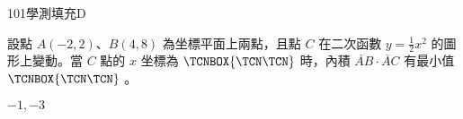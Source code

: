     \begin{QUESTION}
        \begin{ExamInfo}{101}{學測}{填充}{D}
        \end{ExamInfo}
        \begin{ExamAnsRateInfo}{37}{83}{27}{1}
        \end{ExamAnsRateInfo}
        \begin{QBODY}
            設點 $A(-2,2)$、$B(4,8)$ 為坐標平面上兩點，且點 $C$ 在二次函數 $y = \frac{1}{2}x^2$ 的圖形上變動。當 $C$ 點的 $x$ 坐標為 $\TCNBOX{\TCN\TCN}$ 時，內積 $\lvec{AB}\cdot \lvec{AC}$ 有最小值 $\TCNBOX{\TCN\TCN}$ 。
        \end{QBODY}
        \begin{QFROMS}
        \end{QFROMS}
        \begin{QTAGS}\end{QTAGS}
        \begin{QANS}
            $-1,-3$
        \end{QANS}
        \begin{QSOLLIST}
        \end{QSOLLIST}
        \begin{QEMPTYSPACE}
        \end{QEMPTYSPACE}
    \end{QUESTION}
